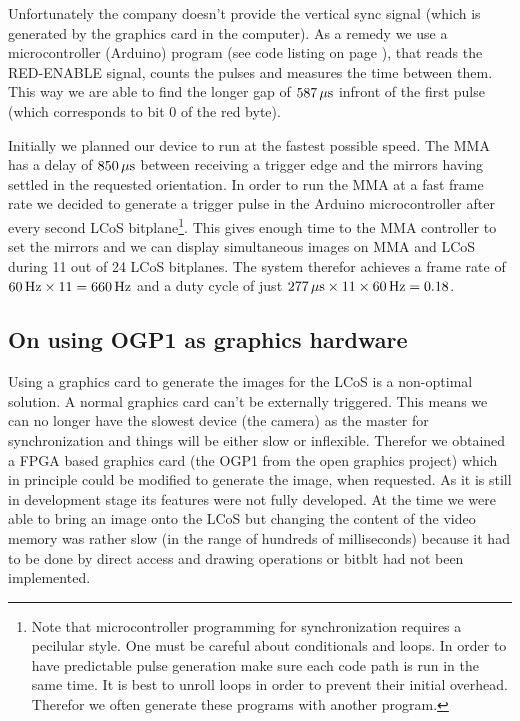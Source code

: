 Unfortunately the company doesn't provide the vertical sync signal
(which is generated by the graphics card in the computer). As a remedy
we use a microcontroller (Arduino) program (see code listing on page
\pageref{fig:arduino-vsync}), that reads the \textsf{RED-ENABLE} signal,
counts the pulses and measures the time between them. This way we are
able to find the longer gap of $\unit[587]{\mu s}$ infront of the
first pulse (which corresponds to bit 0 of the red byte).


Initially we planned our device to run at the fastest possible
speed. The MMA has a delay of $\unit[850]{\mu s}$ between receiving a
trigger edge and the mirrors having settled in the requested
orientation. In order to run the MMA at a fast frame rate we decided
to generate a trigger pulse in the Arduino microcontroller after every
second LCoS bitplane\footnote{Note that microcontroller programming
  for synchronization requires a pecilular style. One must be careful
  about conditionals and loops. In order to have predictable pulse
  generation make sure each code path is run in the same time. It is
  best to unroll loops in order to prevent their initial
  overhead. Therefor we often generate these programs with another
  program.}. This gives enough time to the MMA controller to set the
mirrors and we can display simultaneous images on MMA and LCoS during
11 out of 24 LCoS bitplanes. The system therefor achieves a frame rate
of $\unit[60]{Hz}\times11=\unit[660]{Hz}$ and a duty cycle of just
$\unit[277]{\mu s}\times11\times\unit[60]{Hz}=0.18$.

\subsection{On using OGP1 as graphics hardware}
Using a graphics card to generate the images for the LCoS is a
non-optimal solution. A normal graphics card can't be externally
triggered. This means we can no longer have the slowest device (the
camera) as the master for synchronization and things will be either
slow or inflexible. Therefor we obtained a FPGA based graphics card
(the OGP1 from the open graphics project) which in principle could be
modified to generate the image, when requested. As it is still in
development stage its features were not fully developed. At the time
we were able to bring an image onto the LCoS but changing the content
of the video memory was rather slow (in the range of hundreds of
milliseconds) because it had to be done by direct access and drawing
operations or bitblt had not been implemented.

